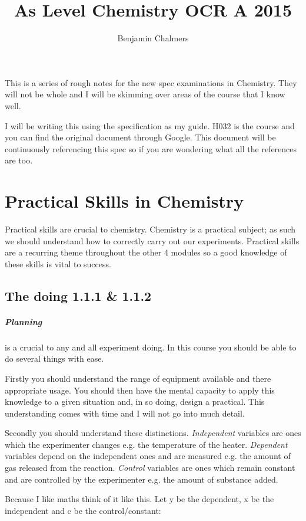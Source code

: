 \documentclass[11pt,a4paper]{memoir}
\author{Benjamin Chalmers}
\title{As Level Chemistry OCR A 2015}
\begin{document}
\frontmatter
\maketitle
\newpage
	This is a series of rough notes for the new spec examinations in Chemistry. They will not be whole and I will be skimming over areas of the course that I know well.
	
	I will be writing this using the specification as my guide. H032 is the course and you can find the original document through Google. This document will be continuously referencing this spec so if you are wondering what all the references are too.
\newpage
\tableofcontents
\mainmatter

\chapter{Practical Skills in Chemistry}
	Practical skills are crucial to chemistry. Chemistry is a practical subject; as such we should understand how to correctly carry out our experiments. Practical skills are a recurring theme throughout the other 4 modules so a good knowledge of these skills is vital to success.

\section{The doing 1.1.1 \& 1.1.2}
	\paragraph{Planning} is a crucial to any and all experiment doing. In this course you should be able to do several things with ease.
	
	Firstly you should understand the range of equipment available and there appropriate usage. You should then have the mental capacity to apply this knowledge to a given situation and, in so doing, design a practical. This understanding comes with time and I will not go into much detail.
	
	Secondly you should understand these distinctions. \textit{Independent} variables are ones which the experimenter changes e.g. the temperature of the heater. \textit{Dependent} variables depend on the independent ones and are measured e.g. the amount of gas released from the reaction. \textit{Control} variables are ones which remain constant and are controlled by the experimenter e.g. the amount of substance added.
	
	Because I like maths think of it like this. Let y be the dependent, x be the independent and c be the control/constant:
	
\end{document}
